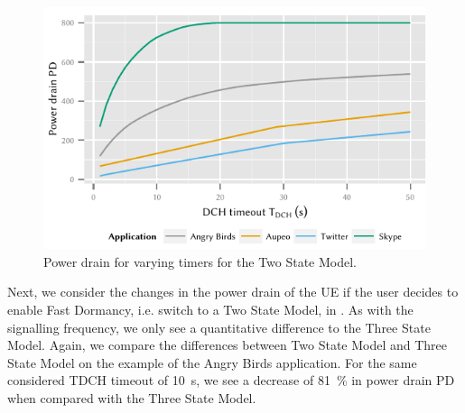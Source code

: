\begin{figure}
	\centering
	\includegraphics{network/network_traces/numerical_results/figures/2_state_tdch_vs_power_drain}
	\caption{Power drain  for varying  timers for the Two State Model.}\label{fig:network:network_traces:numerical_results:two_states:power_drain}
\end{figure}
Next, we consider the changes in the power drain of the \gls{UE} if the user decides to enable Fast Dormancy, i.e. switch to a Two State Model, in .
As with the signalling frequency, we only see a quantitative difference to the Three State Model.
Again, we compare the differences between Two State Model and Three State Model on the example of the Angry Birds application.
For the same considered \gls{TDCH} timeout of \SI{10}{\second}, we see a decrease of \SI{81}{\percent} in power drain \gls{PD} when compared with the Three State Model.

